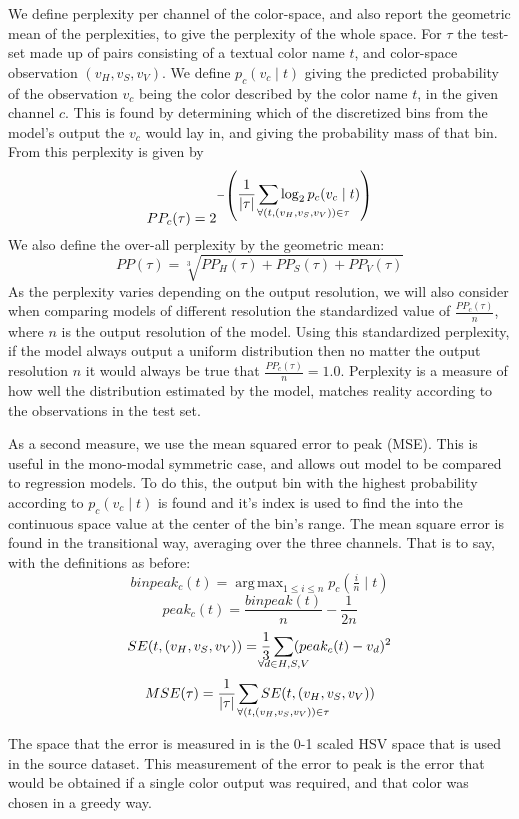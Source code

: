 \documentclass[11pt,letterpaper]{article}
\DeclareMathOperator*{\argmax}{arg\,max}
\begin{document}
We define perplexity per channel of the color-space, and also report the geometric mean of the perplexities, to give the perplexity of the whole space.
For $\tau$ the test-set made up of pairs consisting of a textual color name $t$, and color-space observation $(v_{H}, v_{S}, v_{V})$.
We define $p_{c}(v_{c}\mid t)$ giving the predicted probability of the observation $v_{c}$ being the color described by the color name $t$, in the given channel ${c}$.
This is found by determining which of the discretized bins from the model's output the $v_{c}$ would lay in, and giving the probability mass of that bin.
From this perplexity is given by
\[
 PP_{c}(\tau) = 2^{-\left(
 	\displaystyle\frac{1}{|\tau|} 
 	\displaystyle\sum_{\mathclap{\qquad\qquad\quad
	 		\forall(t,(v_{H}, v_{S}, v_{V})) \in \tau}}
 	 \log_2 p_{c}(v_{c}\mid t)\right)}
\]
We also define the over-all perplexity by the geometric mean: 
\[
PP(\tau) = \sqrt[3]{PP_H(\tau)+PP_S(\tau)+PP_V(\tau)}
\]
As the perplexity varies depending on the output resolution,
we will also consider when comparing models of different resolution the standardized value of $\frac{PP_c(\tau)}{n}$, where $n$ is the output resolution of the model.
Using this standardized perplexity, if the model always output a uniform distribution then no matter the output resolution $n$ it would always be true that  $\frac{PP_c(\tau)}{n}=1.0$.
Perplexity is a measure of how well the distribution estimated by the model, matches reality according to the observations in the test set.


As a second measure, we use the mean squared error to peak (MSE).
This is useful in the mono-modal symmetric case, and allows out model to be compared to regression models.
To do this, the output bin with the highest probability according to $p_c(v_c\mid t)$ is found and it's index is used to find the into the continuous space value at the center of the bin's range.
The mean square error is found in the transitional way, averaging over the three channels.
That is to say, with the definitions as before:
\[
binpeak_c(t)=\argmax_{1\le i \le n}{p_c\left(\tfrac{i}{n} \mid t\right)}
\]
\[
peak_c(t)=\frac{binpeak(t)}{n} - \frac{1}{2n}
\]
\[
SE(t, (v_{H}, v_{S}, v_{V})) = \frac{1}{3}
	\sum_{\mathclap{\forall d\in{H,S,V}}} (peak_c(t) - v_d)^2
\]
\[
MSE(\tau) =\frac{1}{|\tau|}
	\sum_{\mathclap{\qquad\qquad\quad
		\forall(t,(v_{H}, v_{S}, v_{V})) \in \tau}}
	 SE(t,(v_{H}, v_{S}, v_{V}))
\]

The space that the error is measured in is the 0-1 scaled HSV space that is used in the source dataset.
This measurement of the error to peak is the error that would be obtained if a single color output was required, and that color was chosen in a greedy way.
\end{document}

